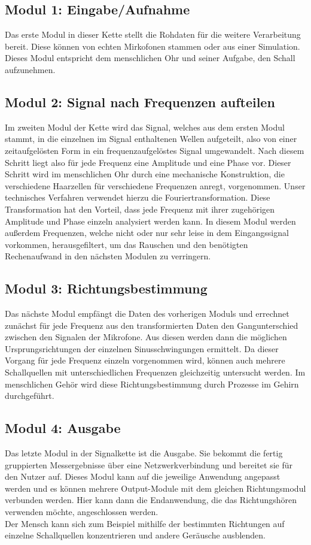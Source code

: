 \subsection{Modul 1: Eingabe/Aufnahme\label{sec:module1}}
Das erste Modul in dieser Kette stellt die Rohdaten für die weitere Verarbeitung bereit. Diese können von echten Mirkofonen stammen oder aus einer Simulation. Dieses Modul entspricht dem menschlichen Ohr und seiner Aufgabe, den Schall aufzunehmen.

\subsection{Modul 2: Signal nach Frequenzen aufteilen}
Im zweiten Modul der Kette wird das Signal, welches aus dem ersten Modul stammt, in die einzelnen im Signal enthaltenen Wellen aufgeteilt, also von einer zeitaufgelösten Form in ein frequenzaufgelöstes Signal umgewandelt. Nach diesem Schritt liegt also für jede Frequenz eine Amplitude und eine Phase vor. Dieser Schritt wird im menschlichen Ohr durch eine mechanische Konstruktion, die verschiedene Haarzellen für verschiedene Frequenzen anregt, vorgenommen. Unser technisches Verfahren verwendet hierzu die Fouriertransformation. Diese Transformation hat den Vorteil, dass jede Frequenz mit ihrer zugehörigen Amplitude und Phase einzeln analysiert werden kann.
In diesem Modul werden außerdem Frequenzen, welche nicht oder nur sehr leise in dem Eingangssignal vorkommen, herausgefiltert, um das Rauschen und den benötigten Rechenaufwand in den nächsten Modulen zu verringern.

\subsection{Modul 3: Richtungsbestimmung}
Das nächste Modul empfängt die Daten des vorherigen Moduls und errechnet zunächst für jede Frequenz aus den transformierten Daten den Gangunterschied zwischen den Signalen der Mikrofone. Aus diesen werden dann die möglichen Ursprungsrichtungen der einzelnen Sinusschwingungen ermittelt. Da dieser Vorgang für jede Frequenz einzeln vorgenommen wird, können auch mehrere Schallquellen mit unterschiedlichen Frequenzen gleichzeitig untersucht werden. Im menschlichen Gehör wird diese Richtungsbestimmung durch Prozesse im Gehirn durchgeführt.

\subsection{Modul 4: Ausgabe\label{sec:module4}}
Das letzte Modul in der Signalkette ist die Ausgabe. Sie bekommt die fertig gruppierten Messergebnisse über eine Netzwerkverbindung und bereitet sie für den Nutzer auf. Dieses Modul kann auf die jeweilige Anwendung angepasst werden und es können mehrere Output-Module mit dem gleichen Richtungsmodul verbunden werden. Hier kann dann die Endanwendung, die das Richtungshören verwenden möchte, angeschlossen werden.\\
Der Mensch kann sich zum Beispiel mithilfe der bestimmten Richtungen auf einzelne Schallquellen konzentrieren und andere Geräusche ausblenden.